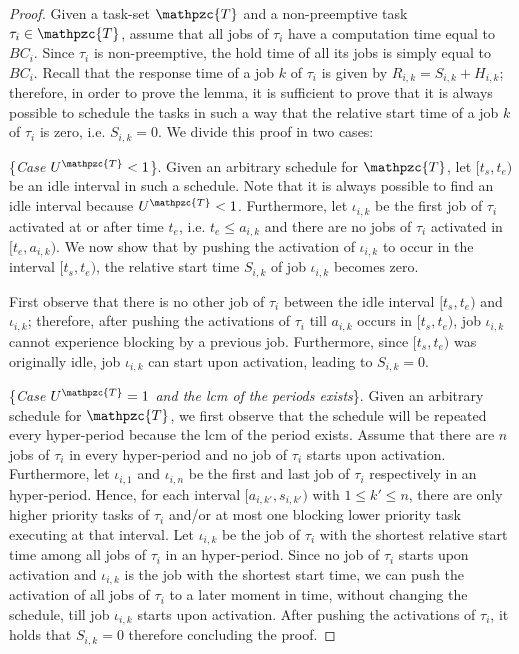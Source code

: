 \documentclass[fleqn]{article}
\begin{document}
\begin{proof}
	Given a task-set $\mathpzc{T}$ and a non-preemptive task $\tau_i \in \mathpzc{T}$, assume that all jobs of $\tau_i$ have a computation time equal to $BC_i$. Since $\tau_i$ is non-preemptive, the hold time of all its jobs is simply equal to $BC_i$. Recall that the response time of a job $k$ of $\tau_i$ is given by $R_{i,k}=S_{i,k}+H_{i,k}$; therefore, in order to prove the lemma, it is sufficient to prove that it is always possible to schedule the tasks in such a way that the relative start time of a job $k$ of $\tau_i$ is zero, i.e. $S_{i,k}=0$. We divide this proof in two cases:
	
	
	
	\{\textit{Case $U^{\mathpzc{T}} < 1$}\}. Given an arbitrary schedule for $\mathpzc{T}$, let $[t_s,t_e)$ be an idle interval in such a schedule. Note that it is always possible to find an idle interval because $U^{\mathpzc{T}} < 1$. Furthermore, let $\iota_{i,k}$  be the first job of $\tau_i$ activated at or after time $t_e$, i.e. $t_e \leq a_{i,k}$ and there are no jobs of $\tau_i$ activated in $[t_e, a_{i,k})$. We now show that by pushing the activation of $\iota_{i,k}$ to occur in the interval $[t_s,t_e)$, the relative start time $S_{i,k}$ of job $\iota_{i,k}$ becomes zero.
	
	First observe that there is no other job of $\tau_i$ between the idle interval $[t_s,t_e)$ and $\iota_{i,k}$; therefore, after pushing the activations of $\tau_i$ till $a_{i,k}$ occurs in $[t_s,t_e)$, job $\iota_{i,k}$ cannot experience blocking by a previous job. Furthermore, since $[t_s,t_e)$ was originally idle, job $\iota_{i,k}$ can start upon activation, leading to $S_{i,k} = 0$.
	
	\{\textit{Case $U^{\mathpzc{T}} = 1$ and the lcm of the periods exists}\}. Given an arbitrary schedule for $\mathpzc{T}$, we first observe that the schedule will be repeated every hyper-period because the lcm of the period exists. Assume that there are $n$ jobs of $\tau_i$ in every hyper-period and no job of $\tau_i$ starts upon activation. Furthermore, let $\iota_{i,1}$ and $\iota_{i,n}$ be the first and last job of $\tau_i$ respectively in an hyper-period. Hence, for each interval $[a_{i,k\prime},s_{i,k\prime})$ with $1 \leq k\prime \leq n$, there are only higher priority tasks of $\tau_i$ and/or at most one blocking lower priority task executing at that interval. Let $\iota_{i,k}$ be the job of $\tau_i$ with the shortest relative start time among all jobs of $\tau_i$ in an hyper-period. Since no job of $\tau_i$ starts upon activation and $\iota_{i,k}$ is the job with the shortest start time, we can push the activation of all jobs of $\tau_i$ to a later moment in time, without changing the schedule, till job $\iota_{i,k}$ starts upon activation. After pushing the activations of $\tau_i$, it holds that $S_{i,k}=0$ therefore concluding the proof.
	
\end{proof}

\begin{thebibliography}{10}
	

\end{thebibliography}
\end{document}
